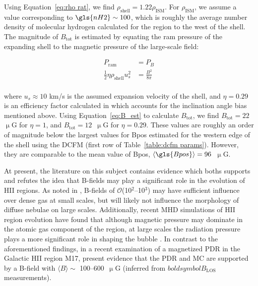 Using Equation~\ref{eq:rho rat}, we find $\rho_{\mathrm{shell}} = 1.22 \rho_{\mathrm{ISM}}$. For $\rho_{\mathrm{ISM}}$, we assume a value corresponding to $\gls{nH2} \sim 100$, which is roughly the average number density of molecular hydrogen calculated for the region to the west of the shell. The magnitude of $B_{\mathrm{\mathrm{tot}}}$ is estimated by equating the ram pressure of the expanding shell to the magnetic pressure of the large-scale field:

\begin{equation}\label{eq:B_est}
  \begin{aligned}
    P_{\mathrm{ram}} &= P_{B} \\
     \frac{1}{2} \eta \rho_{\mathrm{shell}} u_{s}^{2} &= \frac{B^{2}}{8\pi} \\
  \end{aligned}
\end{equation}

where $u_{s} \approx 10$ km/s is the assumed expansion velocity of the shell, and $\eta = 0.29$ is an efficiency factor calculated in \citet{pavel2012h} which accounts for the inclination angle bias mentioned above. Using Equation~\ref{eq:B_est} to calculate $B_{\mathrm{\mathrm{tot}}}$, we find $B_{\mathrm{\mathrm{tot}}} = 22$~$\upmu$G for $\eta = 1$, and $B_{\mathrm{\mathrm{tot}}} = 12$~$\upmu$G for $\eta = 0.29$. These values are roughly an order of magnitude below the largest values for \gls{Bpos} estimated for the western edge of the shell using the DCFM (first row of Table~\ref{table:dcfm params}). However, they are comparable to the mean value of \gls{Bpos}, $\langle \gls{Bpos} \rangle = 96$~$\upmu$G.

At present, the literature on this subject contains evidence which boths supports and refutes the idea that B-fields may play a significant role in the evolution of HII regions. As noted in \citet{tremblin2014age}, B-fields of $\mathcal{O}$(10$^2$--10$^{3}$) may have sufficient influence over dense gas at small scales, but will likely not influence the morphology of diffuse nebulae on large scales. Additionally, recent MHD simulations of HII region evolution have found that although magnetic pressure may dominate in the atomic gas component of the region, at large scales the radiation pressure plays a more significant role in shaping the bubble \citep{rahner2017winds}. In contrast to the aforementioned findings, in a recent examination of a magnetized PDR in the Galactic HII region M17, \citet{pellegrini2007magnetically} present evidence that the PDR and MC are supported by a B-field with $\langle B \rangle \sim$ 100--600~$\upmu$G (inferred from $boldsymbol{B}_{\mathrm{LOS}}$ measurements).


